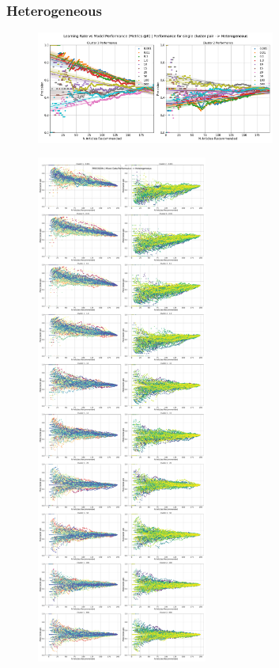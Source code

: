 \documentclass[a4paper,fontsize=8.0pt]{scrartcl}
\begin{document}
\subsubsection{Heterogeneous}
\begin{figure}[H]
    \includegraphics[width=0.7\textwidth]{Graphs/BERT/lr_vs_model_performance_single_mixed_Heterogeneous.pdf}
\end{figure}
\newpage
\begin{figure}[H]
    \includegraphics[width=0.5\textwidth]{Graphs/BERT/lr_vs_model_performance_precision_all_cps_mixed_data_sep_Heterogeneous.pdf}
\end{figure}
\end{document}
